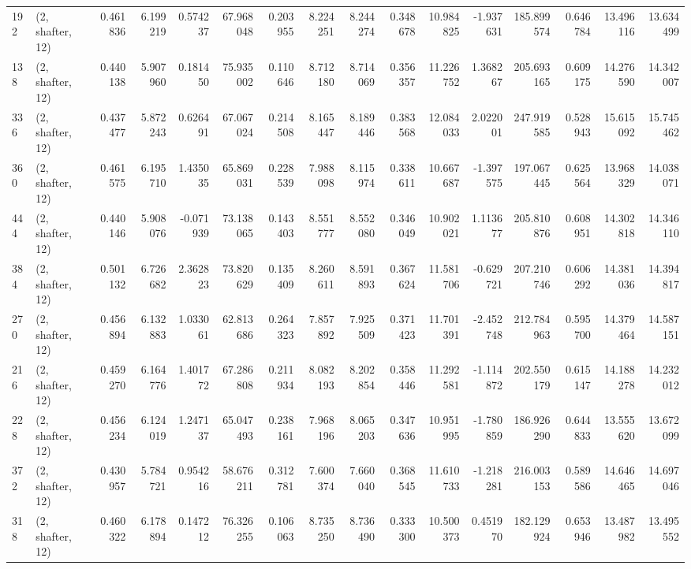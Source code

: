 \begin{tabular}{llrrrrrrrrrrrrrr}
192 &  (2, shafter, 12) &   0.461836 &   6.199219 &   0.574237 &    67.968048 &   0.203955 &   8.224251 &   8.244274 &  0.348678 &  10.984825 &  -1.937631 &   185.899574 &  0.646784 &  13.496116 &  13.634499 \\
138 &  (2, shafter, 12) &   0.440138 &   5.907960 &   0.181450 &    75.935002 &   0.110646 &   8.712180 &   8.714069 &  0.356357 &  11.226752 &   1.368267 &   205.693165 &  0.609175 &  14.276590 &  14.342007 \\
336 &  (2, shafter, 12) &   0.437477 &   5.872243 &   0.626491 &    67.067024 &   0.214508 &   8.165447 &   8.189446 &  0.383568 &  12.084033 &   2.022001 &   247.919585 &  0.528943 &  15.615092 &  15.745462 \\
360 &  (2, shafter, 12) &   0.461575 &   6.195710 &   1.435035 &    65.869031 &   0.228539 &   7.988098 &   8.115974 &  0.338611 &  10.667687 &  -1.397575 &   197.067445 &  0.625564 &  13.968329 &  14.038071 \\
444 &  (2, shafter, 12) &   0.440146 &   5.908076 &  -0.071939 &    73.138065 &   0.143403 &   8.551777 &   8.552080 &  0.346049 &  10.902021 &   1.113677 &   205.810876 &  0.608951 &  14.302818 &  14.346110 \\
384 &  (2, shafter, 12) &   0.501132 &   6.726682 &   2.362823 &    73.820629 &   0.135409 &   8.260611 &   8.591893 &  0.367624 &  11.581706 &  -0.629721 &   207.210746 &  0.606292 &  14.381036 &  14.394817 \\
270 &  (2, shafter, 12) &   0.456894 &   6.132883 &   1.033061 &    62.813686 &   0.264323 &   7.857892 &   7.925509 &  0.371423 &  11.701391 &  -2.452748 &   212.784963 &  0.595700 &  14.379464 &  14.587151 \\
216 &  (2, shafter, 12) &   0.459270 &   6.164776 &   1.401772 &    67.286808 &   0.211934 &   8.082193 &   8.202854 &  0.358446 &  11.292581 &  -1.114872 &   202.550179 &  0.615147 &  14.188278 &  14.232012 \\
228 &  (2, shafter, 12) &   0.456234 &   6.124019 &   1.247137 &    65.047493 &   0.238161 &   7.968196 &   8.065203 &  0.347636 &  10.951995 &  -1.780859 &   186.926290 &  0.644833 &  13.555620 &  13.672099 \\
372 &  (2, shafter, 12) &   0.430957 &   5.784721 &   0.954216 &    58.676211 &   0.312781 &   7.600374 &   7.660040 &  0.368545 &  11.610733 &  -1.218281 &   216.003153 &  0.589586 &  14.646465 &  14.697046 \\
318 &  (2, shafter, 12) &   0.460322 &   6.178894 &   0.147212 &    76.326255 &   0.106063 &   8.735250 &   8.736490 &  0.333300 &  10.500373 &   0.451970 &   182.129924 &  0.653946 &  13.487982 &  13.495552 \\

\end{tabular}
